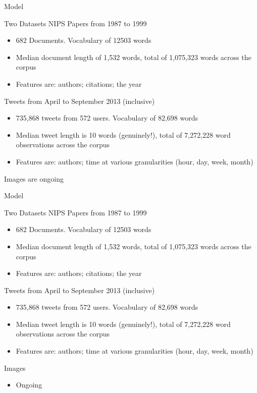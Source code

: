 \documentclass[xcolor=dvipsnames]{beamer}
\begin{document}

\begin{frame}{Model}

Two Datasets
NIPS Papers from 1987 to 1999
\begin{itemize}
    \item 682 Documents. Vocabulary of 12503 words
    \item Median document length of 1,532 words, total of 1,075,323 words across the corpus
    \item Features are: authors; citations; {\color{gray} the year}
\end{itemize}

Tweets from April to September 2013 (inclusive)
\begin{itemize}
    \item 735,868 tweets from 572 users. Vocabulary of 82,698 words
    \item Median tweet length is 10 words (genuinely!), total of 7,272,228 word observations across the corpus 
    \item Features are: authors; time at various granularities (hour, day, week, month)
\end{itemize}

Images are ongoing

\end{frame}


\begin{frame}{Model}

Two Datasets
NIPS Papers from 1987 to 1999
\begin{itemize}
    \item 682 Documents. Vocabulary of 12503 words
    \item Median document length of 1,532 words, total of 1,075,323 words across the corpus
    \item Features are: authors; citations; {\color{gray} the year}
\end{itemize}

Tweets from April to September 2013 (inclusive)
\begin{itemize}
    \item 735,868 tweets from 572 users. Vocabulary of 82,698 words
    \item Median tweet length is 10 words (genuinely!), total of 7,272,228 word observations across the corpus 
    \item Features are: authors; time at various granularities (hour, day, week, month)
\end{itemize}

Images
\begin{itemize}
    \item Ongoing
\end{itemize}

\end{frame}
\end{document}
